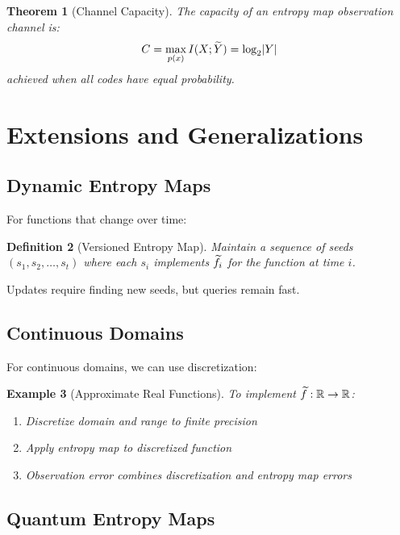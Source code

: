 \documentclass[11pt,final,hidelinks]{article}
\newtheorem{theorem}{Theorem}[section]
\newtheorem{definition}[theorem]{Definition}
\newtheorem{example}[theorem]{Example}
\begin{document}
\begin{theorem}[Channel Capacity]
The capacity of an entropy map observation channel is:
\begin{equation}
C = \max_{p(x)} I(X; \widetilde{Y}) = \log_2 \lvert Y\rvert
\end{equation}
achieved when all codes have equal probability.
\end{theorem}

\section{Extensions and Generalizations}

\subsection{Dynamic Entropy Maps}

For functions that change over time:

\begin{definition}[Versioned Entropy Map]
Maintain a sequence of seeds $(s_1, s_2, \ldots, s_t)$ where each $s_i$ implements $\widetilde{f}_i$ for the function at time $i$.
\end{definition}

Updates require finding new seeds, but queries remain fast.

\subsection{Continuous Domains}

For continuous domains, we can use discretization:

\begin{example}[Approximate Real Functions]
To implement $\widetilde{f}: \mathbb{R} \to \mathbb{R}$:
\begin{enumerate}
    \item Discretize domain and range to finite precision
    \item Apply entropy map to discretized function
    \item Observation error combines discretization and entropy map errors
\end{enumerate}
\end{example}

\subsection{Quantum Entropy Maps}
\end{document}
